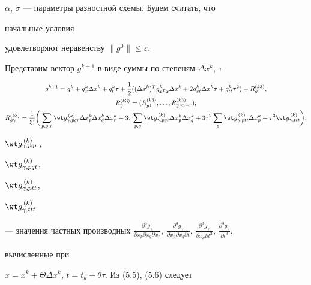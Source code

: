 $\alpha$, $\sigma$ --- параметры разностной схемы. Будем считать, что 


начальные условия 


удовлетворяют неравенству $\|g^0\|\le\varepsilon$. 


 


Представим вектор $g^{k+1}$ в виде суммы по степеням $\Delta x^k$, $\tau$ 


\begin{gather} 


g^{k+1}=g^k+g^k_x\Delta x^k+g^k_t\tau+\frac{1}{2} 


((\Delta x^k)^T g^k_{x^T x} \Delta x^k+ 2g^k_{x t}\Delta x^k\tau+ 


g^k_{t t}\tau^2)+R^{(k3)}_g,\\ 


% 


R^{(k3)}_g=(R^{(k3)}_{g1},\dotsc,R^{(k3)}_{g,m+r}),\notag \\ 


% 


R^{(k3)}_{g\gamma}=\frac{1}{3!}\bigg(\sum_{p,q,r} 


\wt g^{\,(k)}_{\gamma,p q r} \Delta x^k_p \Delta x^k_q 


\Delta x^k_r+3\tau\sum_{p,q}\wt g^{\,(k)}_{\gamma,p q t} 


\Delta x^k_p \Delta x^k_q+3\tau^2\sum_p 


\wt g^{\,(k)}_{\gamma,p t t}\Delta x^k_p +\tau^3 


\wt g^{\,(k)}_{\gamma,t t t}\bigg),\notag 


\end{gather} 


$\wt g^{\,(k)}_{\gamma,p q r}$, 


$\wt g^{\,(k)}_{\gamma,p q t}$, 


$\wt g^{\,(k)}_{\gamma,p t t}$, 


$\wt g^{\,(k)}_{\gamma,t t t}$ 


--- значения частных производных $\frac{\partial^3g_\gamma}{\partial 


x_p\partial x_q\partial x_r}$, $\frac{\partial^3g_\gamma}{\partial 


x_p\partial x_q\partial t}$, $\frac{\partial^3g_\gamma}{\partial 


x_p\partial t^2}$, $\frac{\partial^3g_\gamma}{\partial t^3}$,


вычисленные при


$x=x^k+\Theta\Delta x^k$, $t=t_k+\theta\tau$. Из (5.5), (5.6) следует 


